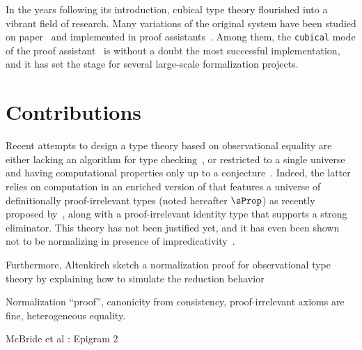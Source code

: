 In the years following its introduction, cubical type theory flourished into a 
vibrant field of research.
% 
Many variations of the original system have been studied on paper~\cite{AngiuliHouHarper18,ABCFHL}
and implemented in proof assistants~\cite{Cubicaltt, redtt}.
% 
Among them, the \texttt{cubical} mode of the \Agda proof assistant~
is without a doubt the most successful implementation, and it has set the stage for several 
large-scale formalization projects.


\section{Contributions}

Recent attempts to design a type theory based on observational equality
are either lacking an algorithm for type checking~, or restricted to a single
universe and having computational properties only up to a
conjecture~. Indeed, the latter relies on computation
in an enriched version of \MLTT that features a universe of definitionally
proof-irrelevant types (noted hereafter $\sProp$) as recently proposed
by~, along with a proof-irrelevant identity type
that supports a strong eliminator. This theory has not been justified yet,
and it has even been shown not to be normalizing in presence of
impredicativity~.

Furthermore, Altenkirch \etal sketch a normalization proof for observational 
type theory by explaining how to simulate the reduction behavior 

Normalization ``proof'', canonicity from consistency, proof-irrelevant axioms 
are fine, heterogeneous equality.

McBride et al : Epigram 2

